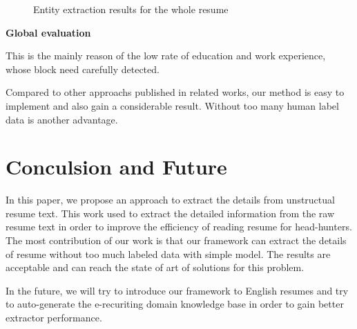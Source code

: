 \documentclass{acm_proc_article-sp}
\begin{document}
\begin{figure}\label{total-scores}
\centering
{}
\caption{Entity extraction results for the whole resume}
\end{figure}

\textbf{Global evaluation}

This is the mainly reason of the low rate of education and work experience, whose block need carefully detected.

Compared to other approachs published in related works, our method is easy to implement and also gain a considerable result.
Without too many human label data is another advantage.


\section{Conculsion and Future}\label{conculsion-future}

In this paper, we propose an approach to extract the details from unstructual resume text. 
This work used to extract the detailed information from the raw resume text in order to improve the efficiency of reading resume for head-hunters.
The most contribution of our work is that our framework can extract the details of resume without too much labeled data with simple model.
The results are acceptable and can reach the state of art of solutions for this problem.

In the future, we will try to introduce our framework to English resumes and try to auto-generate the e-recuriting domain knowledge base in order to gain better extractor performance.



 
\end{document}
